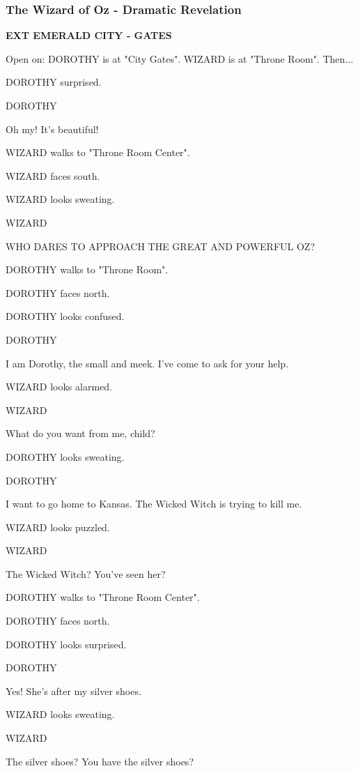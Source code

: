 \documentclass[11pt,letterpaper,oldstylefigures]{memoir}
\newcommand{\slugline}[1]{\nobreak\textbf{\MakeUppercase{#1}}\par\nobreak\vspace{1\baselineskip}}
\newcommand{\speaker}[1]{\nobreak\hspace*{0.333\textwidth}\MakeUppercase{#1}\par\nobreak\vspace{0.5\baselineskip}}
\newcommand{\dialogue}[1]{\nobreak\hspace*{0.25\textwidth}\begin{minipage}{0.5\textwidth}#1\end{minipage}\par\vspace{1\baselineskip}}
\newcommand{\stagedir}[1]{#1\par\vspace{1\baselineskip}}
\newenvironment{FountainExample}
  {\begingroup
  \ttfamily\small
   \setlength{\parindent}{0pt}
  \setlength{\parskip}{0.5em}
  \allowdisplaybreaks
  \setlength{\displaywidowpenalty}{0}
  \setlength{\widowpenalty}{0}
  \setlength{\clubpenalty}{0}
  \setlength{\interlinepenalty}{0}
}
  {\endgroup}
\begin{document}
\subsubsection*{The Wizard of Oz - Dramatic Revelation}
\label{ex:wizard-of-oz-dramatic-revelation}

\begin{FountainExample}
\slugline{EXT EMERALD CITY - GATES}

\stagedir{Open on: DOROTHY is at "City Gates". WIZARD is at "Throne Room". Then...}

\stagedir{DOROTHY surprised.}

\speaker{DOROTHY}
\dialogue{Oh my! It's beautiful!}

\stagedir{WIZARD walks to "Throne Room Center".}

\stagedir{WIZARD faces south.}

\stagedir{WIZARD looks sweating.}

\speaker{WIZARD}
\dialogue{WHO DARES TO APPROACH THE GREAT AND POWERFUL OZ?}

\stagedir{DOROTHY walks to "Throne Room".}

\stagedir{DOROTHY faces north.}

\stagedir{DOROTHY looks confused.}

\speaker{DOROTHY}
\dialogue{I am Dorothy, the small and meek. I've come to ask for your help.}

\stagedir{WIZARD looks alarmed.}

\speaker{WIZARD}
\dialogue{What do you want from me, child?}

\stagedir{DOROTHY looks sweating.}

\speaker{DOROTHY}
\dialogue{I want to go home to Kansas. The Wicked Witch is trying to kill me.}

\stagedir{WIZARD looks puzzled.}

\speaker{WIZARD}
\dialogue{The Wicked Witch? You've seen her?}

\stagedir{DOROTHY walks to "Throne Room Center".}

\stagedir{DOROTHY faces north.}

\stagedir{DOROTHY looks surprised.}

\speaker{DOROTHY}
\dialogue{Yes! She's after my silver shoes.}

\stagedir{WIZARD looks sweating.}

\speaker{WIZARD}
\dialogue{The silver shoes? You have the silver shoes?}


\end{FountainExample}
\end{document}

